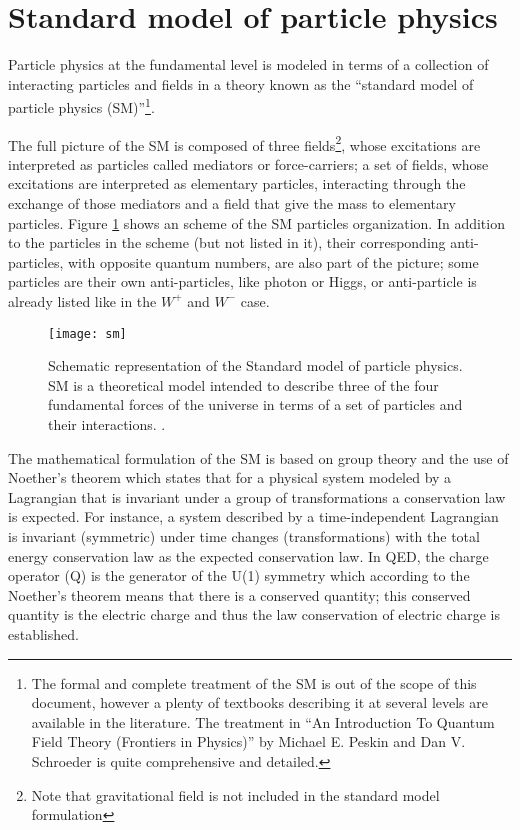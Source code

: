 \section{Standard model of particle physics}
\label{secc:SM}

\noindent Particle physics at the fundamental level is modeled in terms of a collection of interacting particles and fields in a theory known as the ``standard model of particle physics (SM)''\footnote{The formal and complete treatment of the SM is out of the scope of this document, however a plenty of textbooks describing it at several levels are available in the literature. The treatment in ``An Introduction To Quantum Field Theory (Frontiers in Physics)'' by  Michael E. Peskin and Dan V. Schroeder is quite comprehensive and detailed.}.

\noindent The full picture of the SM is composed of three fields\footnote{Note that gravitational field is not included in the standard model formulation}, whose excitations are interpreted as particles called mediators or force-carriers; a set of fields, whose excitations are interpreted as elementary particles, interacting through the exchange of those mediators and a field that give the mass to elementary particles. Figure \ref{sm} shows an scheme of the SM particles organization. In addition to the particles in the scheme (but not listed in it), their corresponding anti-particles, with opposite quantum numbers, are also part of the picture; some particles are their own anti-particles, like photon or Higgs, or anti-particle is already listed like in the $W^+$  and $W^-$ case.\\

\begin{figure}[h!]
  \centering
  \texttt{[image: sm]}
  \caption[Standard model of particle physics.]{Schematic representation of the Standard model of particle physics. SM is a theoretical model intended to describe three of the four fundamental forces of the universe in terms of a set of particles and their interactions. \cite{smpicture}.}
  \label{sm}
\end{figure}

\noindent The mathematical formulation of the SM is based on group theory and the use of Noether's theorem\cite{noether} which states that for a physical system modeled by a Lagrangian that is invariant under a group of transformations a conservation law is expected. For instance, a system described by a time-independent Lagrangian is invariant (symmetric) under time changes (transformations) with the total energy conservation law as the expected conservation law. In QED, the charge operator (Q) is the generator of the U(1) symmetry which according to the Noether's theorem means that there is a conserved quantity; this conserved quantity is the electric charge and thus the law conservation of electric charge is established.\\

